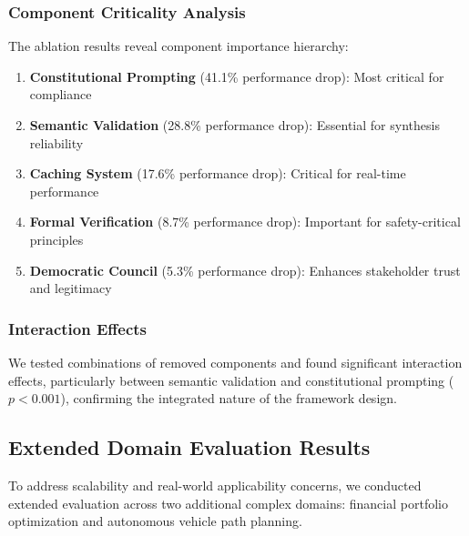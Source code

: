 \documentclass[sigconf,natbib]{acmart}
\begin{document}
\subsubsection{Component Criticality Analysis}
The ablation results reveal component importance hierarchy:

\begin{enumerate}
    \item \textbf{Constitutional Prompting} (41.1\% performance drop): Most critical for compliance
    \item \textbf{Semantic Validation} (28.8\% performance drop): Essential for synthesis reliability
    \item \textbf{Caching System} (17.6\% performance drop): Critical for real-time performance
    \item \textbf{Formal Verification} (8.7\% performance drop): Important for safety-critical principles
    \item \textbf{Democratic Council} (5.3\% performance drop): Enhances stakeholder trust and legitimacy
\end{enumerate}

\subsubsection{Interaction Effects}
We tested combinations of removed components and found significant interaction effects, particularly between semantic validation and constitutional prompting ($p < 0.001$), confirming the integrated nature of the framework design.

\subsection{Extended Domain Evaluation Results}
\label{subsec:extended_evaluation}

To address scalability and real-world applicability concerns, we conducted extended evaluation across two additional complex domains: financial portfolio optimization and autonomous vehicle path planning.
\end{document}
